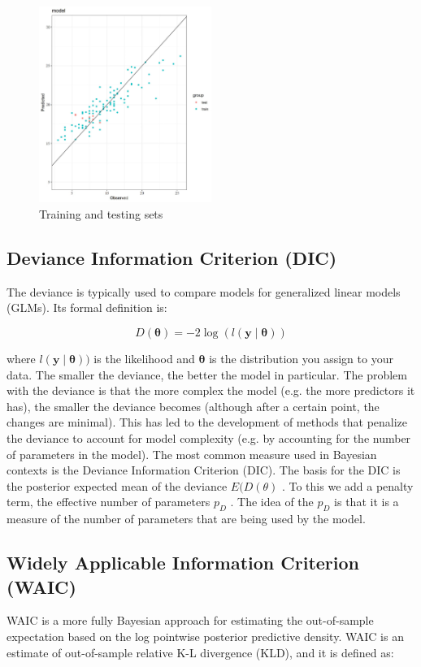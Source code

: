 \documentclass{mcmthesis}
\begin{document}
\begin{figure}[htp]
    \centering
    \includegraphics[width=0.5\textwidth]{images/training.png}
    \caption{Training and testing sets}
    \label{pre1}
\end{figure}

\subsection{Deviance Information Criterion (DIC)}
The deviance is typically used to compare models for generalized linear models (GLMs). Its formal definition is:

$$
D(\boldsymbol{\theta})=-2 \log (l(\boldsymbol{y} \mid \boldsymbol{\theta}))
$$

where  $l(\boldsymbol{y} \mid \boldsymbol{\theta}))$  is the likelihood and  $\boldsymbol{\theta}$  is the distribution you assign to your data. The smaller the deviance, the better the model in particular. The problem with the deviance is that the more complex the model (e.g. the more predictors it has), the smaller the deviance becomes (although after a certain point, the changes are minimal). This has led to the development of methods that penalize the deviance to account for model complexity (e.g. by accounting for the number of parameters in the model). The most common measure used in Bayesian contexts is the Deviance Information Criterion (DIC). The basis for the DIC is the posterior expected mean of the deviance  $E(D(\theta)$ . To this we add a penalty term, the effective number of parameters  $p_{D}$ . The idea of the  $p_{D}$  is that it is a measure of the number of parameters that are being used by the model.

\subsection{Widely Applicable Information Criterion (WAIC)}
WAIC is a more fully Bayesian approach for estimating the out-of-sample expectation based on the log pointwise posterior predictive density. WAIC is an estimate of out-of-sample relative K-L divergence (KLD), and it is defined as:
\end{document}

